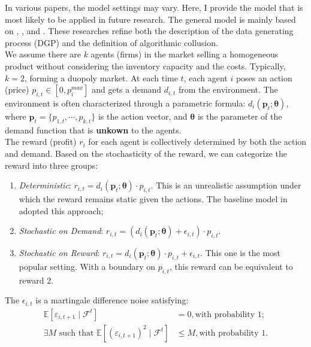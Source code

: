\documentclass[12pt]{article}
\begin{document}
In various papers, the model settings may vary. Here, I provide the model that is most likely to be applied in future research. The general model is mainly based on \cite{cooper2015learning}, \cite{meylahn2022learning}, and \cite{den2023mathematical}. These researches refine both the description of the data generating process (DGP) and the definition of algorithmic collusion.\\

We assume there are $k$ agents (firms) in the market selling a homogeneous product without considering the inventory capacity and the costs. Typically, $k=2$, forming a duopoly market. At each time $t$, each agent $i$ poses an action (price) $p_{i,t}\in [0,p_i^{max}]$ and gets a demand $d_{i,t}$ from the environment. The environment is often characterized through a parametric formula: $d_{i}(\boldsymbol{p}_t;\boldsymbol{\theta})$, where $\boldsymbol{p}_t=\{p_{1,t},\cdots,p_{k,t}\}$ is the action vector, and $\boldsymbol{\theta}$ is the parameter of the demand function that is \textbf{unkown} to the agents. \\

The reward (profit) $r_i$ for each agent is collectively determined by both the action and demand. Based on the stochasticity of the reward, we can categorize the reward into three groups: 
\begin{enumerate}
    \item \textit{Deterministic}: $r_{i,t}=d_{i}(\boldsymbol{p}_t;\boldsymbol{\theta}) \cdot p_{i,t}$. This is an unrealistic assumption under which the reward remains static given the actions. The baseline model in \cite{calvano2020artificial} adopted this approach;
    \item \textit{Stochastic on Demand}: $r_{i,t}=(d_{i}(\boldsymbol{p}_t;\boldsymbol{\theta}) + \epsilon_{i,t}) \cdot p_{i,t}$.
    \item \textit{Stochastic on Reward}: $r_{i,t}=d_{i}(\boldsymbol{p}_t;\boldsymbol{\theta}) \cdot p_{i,t} + \epsilon_{i,t}$. This one is the most popular setting. With a boundary on $p_{i,t}$, this reward can be equivalent to reward 2. 
\end{enumerate}

The $\epsilon_{i,t}$ is a martingale difference noise satisfying:
\begin{align*}
    \mathbb{E}[\varepsilon_{i,t+1}\mid\mathcal{F}^{t}]&=0, \text{with probability 1};\\
    \exists M \text{ such that } \mathbb{E}[(\varepsilon_{i,t+1})^2\mid\mathcal{F}^{t}]& \le M, \text{with probability 1}.
\end{align*}
\end{document}
